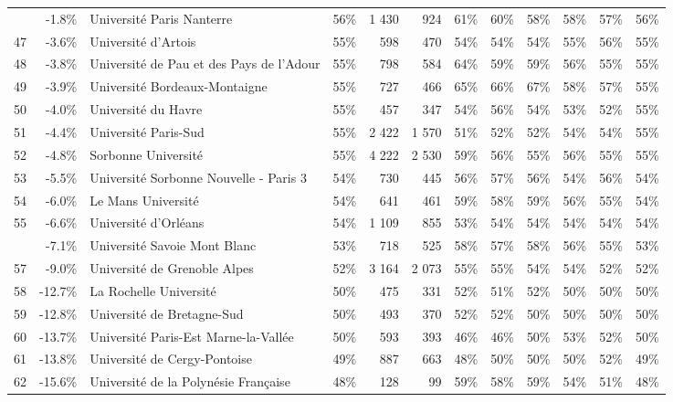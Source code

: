 \documentclass[12pt,french,landscape]{article}
\begin{document}
\begin{longtable}{rrlrrrrrrlrr}
\addlinespace
46 & -1.8\% & Université Paris Nanterre & 56\% & 1 430 & 924 & 61\% & 60\% & 58\% & 58\% & 57\% & 56\%\\
\rowcolor{gray!6}  47 & -3.6\% & Université d'Artois & 55\% & 598 & 470 & 54\% & 54\% & 54\% & 55\% & 56\% & 55\%\\
48 & -3.8\% & Université de Pau et des Pays de l'Adour & 55\% & 798 & 584 & 64\% & 59\% & 59\% & 56\% & 55\% & 55\%\\
\rowcolor{gray!6}  49 & -3.9\% & Université Bordeaux-Montaigne & 55\% & 727 & 466 & 65\% & 66\% & 67\% & 58\% & 57\% & 55\%\\
50 & -4.0\% & Université du Havre & 55\% & 457 & 347 & 54\% & 56\% & 54\% & 53\% & 52\% & 55\%\\
\addlinespace
\rowcolor{gray!6}  51 & -4.4\% & Université Paris-Sud & 55\% & 2 422 & 1 570 & 51\% & 52\% & 52\% & 54\% & 54\% & 55\%\\
52 & -4.8\% & Sorbonne Université & 55\% & 4 222 & 2 530 & 59\% & 56\% & 55\% & 56\% & 55\% & 55\%\\
\rowcolor{gray!6}  53 & -5.5\% & Université Sorbonne Nouvelle - Paris 3 & 54\% & 730 & 445 & 56\% & 57\% & 56\% & 54\% & 56\% & 54\%\\
54 & -6.0\% & Le Mans Université & 54\% & 641 & 461 & 59\% & 58\% & 59\% & 56\% & 55\% & 54\%\\
\rowcolor{gray!6}  55 & -6.6\% & Université d'Orléans & 54\% & 1 109 & 855 & 53\% & 54\% & 54\% & 54\% & 54\% & 54\%\\
\addlinespace
56 & -7.1\% & Université Savoie Mont Blanc & 53\% & 718 & 525 & 58\% & 57\% & 58\% & 56\% & 55\% & 53\%\\
\rowcolor{gray!6}  57 & -9.0\% & Université de Grenoble Alpes & 52\% & 3 164 & 2 073 & 55\% & 55\% & 54\% & 54\% & 52\% & 52\%\\
58 & -12.7\% & La Rochelle Université & 50\% & 475 & 331 & 52\% & 51\% & 52\% & 50\% & 50\% & 50\%\\
\rowcolor{gray!6}  59 & -12.8\% & Université de Bretagne-Sud & 50\% & 493 & 370 & 52\% & 52\% & 50\% & 50\% & 50\% & 50\%\\
60 & -13.7\% & Université Paris-Est Marne-la-Vallée & 50\% & 593 & 393 & 46\% & 46\% & 50\% & 53\% & 52\% & 50\%\\
\addlinespace
\rowcolor{gray!6}  61 & -13.8\% & Université de Cergy-Pontoise & 49\% & 887 & 663 & 48\% & 50\% & 50\% & 50\% & 52\% & 49\%\\
62 & -15.6\% & Université de la Polynésie Française & 48\% & 128 & 99 & 59\% & 58\% & 59\% & 54\% & 51\% & 48\%\\

\end{longtable}
\end{document}
